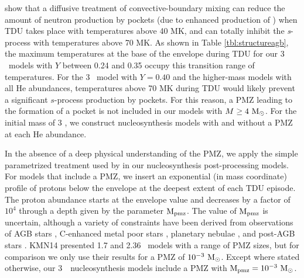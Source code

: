 \citet{Goriely:2004gw} show that a diffusive treatment of convective-boundary mixing can reduce the amount of neutron production by  pockets (due to enhanced production of ) when TDU takes place with temperatures above 40 MK, and can totally inhibit the \textit{s}-process with temperatures above 70 MK. As shown in Table \ref{tbl:structureagb}, the maximum temperatures at the base of the envelope during TDU for our 3 \Msun\ models with $Y$ between 0.24 and 0.35 occupy this transition range of temperatures. For the 3 \Msun\ model with $Y=0.40$ and the higher-mass models with all He abundances, temperatures above 70 MK during TDU would likely prevent a significant $s$-process production by  pockets. For this reason, a PMZ leading to the formation of a  pocket is not included in our models with $M \geq 4\ \mathrm{M}_{\odot}$. For the initial mass of 3 \Msun, we construct nucleosynthesis models with and without a PMZ at each He abundance.

In the absence of a deep physical understanding of the PMZ, we apply the simple parametrized treatment used by \citet{Lugaro:2004en} \citep[similar to][]{Goriely:2000vs} in our nucleosynthesis post-processing models. For models that include a PMZ, we insert an exponential (in mass coordinate) profile of protons below the envelope at the deepest extent of each TDU episode. The proton abundance starts at the envelope value and decreases by a factor of $10^{4}$ through a depth given by the parameter $\mathrm{M}_\mathrm{pmz}$. The value of $\mathrm{M}_\mathrm{pmz}$ is uncertain, although a variety of constraints have been derived from observations of AGB stars \citep{Abia:2002kh}, C-enhanced metal poor stars \citep{Izzard:2009hg,Bisterzo:2012bf,Lugaro:2012ht}, planetary nebulae \citep{Miszalski:2013gi,Shingles:2013kg}, and post-AGB stars \citep{BonacicMarinovic:2007jl,DeSmedt:2012dp}. KMN14 presented 1.7 and 2.36 \Msun\ models with a range of PMZ sizes, but for comparison we only use their results for a PMZ of $10^{-3}\ \mathrm{M}_{\odot}$. Except where stated otherwise, our 3\ \Msun\ nucleosynthesis models include a PMZ with $\mathrm{M}_\mathrm{pmz}=10^{-3}\ \mathrm{M}_{\odot}$.

